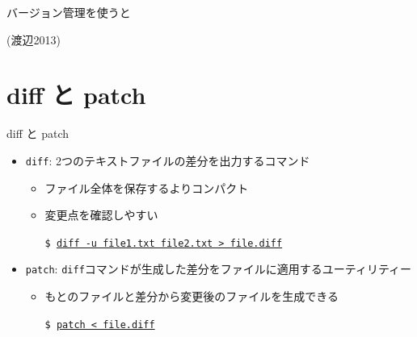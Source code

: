 \documentclass[dvipdfmx]{beamer}
\begin{document}
\begin{frame}[t,fragile]{バージョン管理を使うと}
  \vspace*{-1.8em}
  \begin{center}
  \end{center}
  \vspace*{-2em}
  {\footnotesize (渡辺2013)}
\end{frame}

\section{diff と patch}

\begin{frame}[t,fragile]{diff と patch}
  \begin{itemize}
    \setlength{\itemsep}{1em}
  \item {\tt diff}: 2つのテキストファイルの差分を出力するコマンド
    \begin{itemize}
    \item ファイル全体を保存するよりコンパクト
    \item 変更点を確認しやすい
      
      {\tt \$ \underline{diff -u file1.txt file2.txt > file.diff}}
    \end{itemize}
  \item {\tt patch}: {\tt diff}コマンドが生成した差分をファイルに適用するユーティリティー
    \begin{itemize}
    \item もとのファイルと差分から変更後のファイルを生成できる

      {\tt \$ \underline{patch < file.diff}}
    \end{itemize}
  \end{itemize}
\end{frame}
\end{document}
